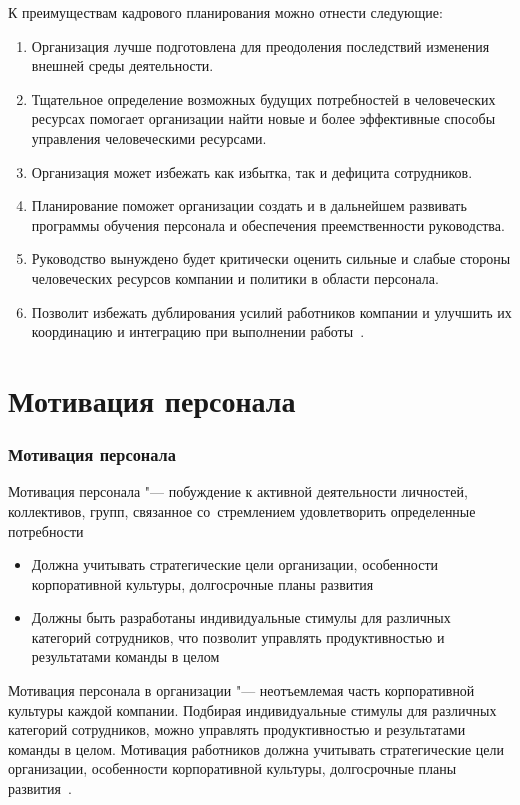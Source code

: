 \documentclass{../industrial-development}
\begin{document}
\lecturenotes

К преимуществам кадрового планирования можно отнести следующие:
  \begin{enumerate}
\item	Организация лучше подготовлена для преодоления последствий изменения внешней среды деятельности.
\item	Тщательное определение возможных будущих потребностей в человеческих ресурсах помогает организации найти новые и более эффективные способы управления человеческими ресурсами.
\item	Организация может избежать как избытка, так и дефицита сотрудников.
\item	Планирование поможет организации создать и в дальнейшем развивать программы обучения персонала и обеспечения преемственности руководства.
\item	Руководство вынуждено будет критически оценить сильные и слабые стороны человеческих ресурсов компании и политики в области персонала.
\item	Позволит избежать дублирования усилий работников компании и улучшить их координацию и интеграцию при выполнении работы~\cite[с.~89]{Ivanova}.
\end{enumerate}

\section{Мотивация персонала}
\begin{frame} \frametitle{Мотивация персонала}

\alert{Мотивация персонала} "--- побуждение к активной деятельности личностей, коллективов, групп, связанное со~стремлением удовлетворить определенные потребности
 \begin{itemize}
\item Должна учитывать стратегические цели организации, особенности корпоративной культуры, долгосрочные планы развития
\item Должны быть разработаны индивидуальные стимулы для различных категорий сотрудников, что позволит управлять продуктивностью и результатами команды в целом 
\end{itemize}
\end{frame}

\lecturenotes

Мотивация персонала в организации "--- неотъемлемая часть корпоративной культуры каждой компании. Подбирая индивидуальные стимулы для различных категорий сотрудников, можно управлять продуктивностью и результатами команды в целом. Мотивация работников должна учитывать стратегические цели организации, особенности корпоративной культуры, долгосрочные планы развития~\cite{MotivPerson}.
\end{document}
